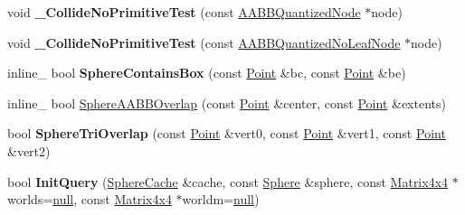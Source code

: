 \begin{DoxyCompactItemize}
\item 
void {\bfseries \+\_\+\+Collide\+No\+Primitive\+Test} (const \hyperlink{classAABBQuantizedNode}{A\+A\+B\+B\+Quantized\+Node} $\ast$node)\hypertarget{classSphereCollider_ae92449297f94e2edd2ac463befbfcdf0}{}\label{classSphereCollider_ae92449297f94e2edd2ac463befbfcdf0}

\item 
void {\bfseries \+\_\+\+Collide\+No\+Primitive\+Test} (const \hyperlink{classAABBQuantizedNoLeafNode}{A\+A\+B\+B\+Quantized\+No\+Leaf\+Node} $\ast$node)\hypertarget{classSphereCollider_a9a17662f7c12c190bcf996329019e3af}{}\label{classSphereCollider_a9a17662f7c12c190bcf996329019e3af}

\item 
inline\+\_\+ bool {\bfseries Sphere\+Contains\+Box} (const \hyperlink{classPoint}{Point} \&bc, const \hyperlink{classPoint}{Point} \&be)\hypertarget{classSphereCollider_af91e473c490bf39e08cb19da4b1c761a}{}\label{classSphereCollider_af91e473c490bf39e08cb19da4b1c761a}

\item 
inline\+\_\+ bool \hyperlink{classSphereCollider_aa281cba28384e7c51aade4f102edf9f6}{Sphere\+A\+A\+B\+B\+Overlap} (const \hyperlink{classPoint}{Point} \&center, const \hyperlink{classPoint}{Point} \&extents)
\item 
bool {\bfseries Sphere\+Tri\+Overlap} (const \hyperlink{classPoint}{Point} \&vert0, const \hyperlink{classPoint}{Point} \&vert1, const \hyperlink{classPoint}{Point} \&vert2)\hypertarget{classSphereCollider_a0363893f9119fcbee7dff93c8564f3f8}{}\label{classSphereCollider_a0363893f9119fcbee7dff93c8564f3f8}

\item 
bool {\bfseries Init\+Query} (\hyperlink{structSphereCache}{Sphere\+Cache} \&cache, const \hyperlink{classSphere}{Sphere} \&sphere, const \hyperlink{classMatrix4x4}{Matrix4x4} $\ast$worlds=\hyperlink{IceTypes_8h_ac97b8ee753e4405397a42ad5799b0f9e}{null}, const \hyperlink{classMatrix4x4}{Matrix4x4} $\ast$worldm=\hyperlink{IceTypes_8h_ac97b8ee753e4405397a42ad5799b0f9e}{null})\hypertarget{classSphereCollider_a06a934db23544e0747cf9772c0cfdcbf}{}\label{classSphereCollider_a06a934db23544e0747cf9772c0cfdcbf}

\end{DoxyCompactItemize}
